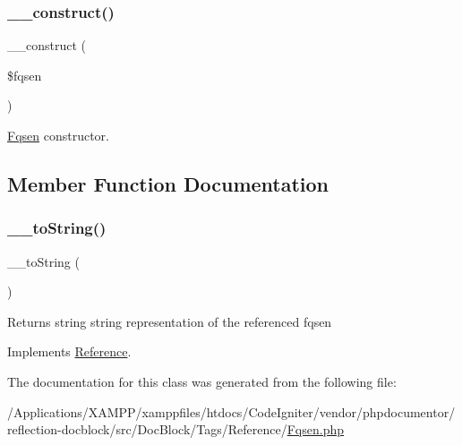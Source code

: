 \subsubsection{\texorpdfstring{\+\_\+\+\_\+construct()}{\_\_construct()}}
{\footnotesize\ttfamily \+\_\+\+\_\+construct (\begin{DoxyParamCaption}\item[{Real\+Fqsen}]{\$fqsen }\end{DoxyParamCaption})}

\mbox{\hyperlink{classphp_documentor_1_1_reflection_1_1_doc_block_1_1_tags_1_1_reference_1_1_fqsen}{Fqsen}} constructor. 

\subsection{Member Function Documentation}
\mbox{\label{classphp_documentor_1_1_reflection_1_1_doc_block_1_1_tags_1_1_reference_1_1_fqsen_a7516ca30af0db3cdbf9a7739b48ce91d}} 
\subsubsection{\texorpdfstring{\+\_\+\+\_\+to\+String()}{\_\_toString()}}
{\footnotesize\ttfamily \+\_\+\+\_\+to\+String (\begin{DoxyParamCaption}{ }\end{DoxyParamCaption})}

\begin{DoxyReturn}{Returns}
string string representation of the referenced fqsen 
\end{DoxyReturn}


Implements \mbox{\hyperlink{interfacephp_documentor_1_1_reflection_1_1_doc_block_1_1_tags_1_1_reference_1_1_reference_a7516ca30af0db3cdbf9a7739b48ce91d}{Reference}}.



The documentation for this class was generated from the following file\+:\begin{DoxyCompactItemize}
\item 
/\+Applications/\+X\+A\+M\+P\+P/xamppfiles/htdocs/\+Code\+Igniter/vendor/phpdocumentor/reflection-\/docblock/src/\+Doc\+Block/\+Tags/\+Reference/\mbox{\hyperlink{reflection-docblock_2src_2_doc_block_2_tags_2_reference_2_fqsen_8php}{Fqsen.\+php}}\end{DoxyCompactItemize}
